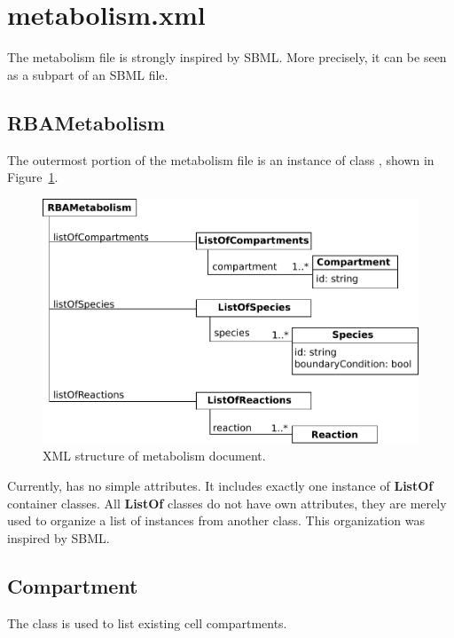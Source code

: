
\section{metabolism.xml}

The metabolism file is strongly inspired by SBML.\@
More precisely, it can be seen as a subpart of an SBML file.


\subsection{RBAMetabolism}
\label{sec:rba_metabolism}

The outermost portion of the metabolism file is an instance of class
\rbametabolism, shown in Figure~\ref{fig:metabolism_doc}.

\begin{figure}
  \centering
  \includegraphics[scale=0.8]{figures/metabolism_doc}
  \caption{XML structure of metabolism document.}
\label{fig:metabolism_doc}
\end{figure}

Currently, \rbametabolism{} has no simple attributes.
It includes exactly one instance of \textbf{ListOf} container classes.
All \textbf{ListOf} classes do not have own attributes,
they are merely used to organize a list of instances from another class.
This organization was inspired by SBML.\@


\subsection{Compartment}
\label{sec:compartment}

The \compartment{} class is used to list existing cell compartments.

